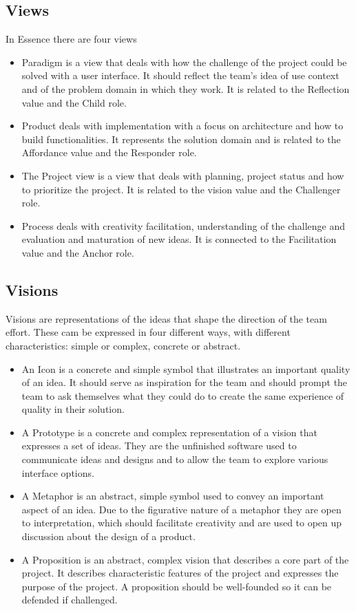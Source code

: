 \subsection{Views} 
In Essence there are four views

\begin{itemize}
\item Paradigm is a view that deals with how the challenge of the project could be solved with a user interface. It should reflect the team's idea of use context and of the problem domain in which they work. It is related to the Reflection value and the Child role.
\item Product deals with implementation with a focus on architecture and how to build functionalities. It represents the solution domain and is related to the Affordance value and the Responder role.
\item The Project view is a view that deals with planning, project status and how to prioritize the project. It is related to the vision value and the Challenger role. 
\item Process deals with creativity facilitation, understanding of the challenge and evaluation and maturation of new ideas. It is connected to the Facilitation value and the Anchor role. 
\end{itemize} 

\subsection{Visions} 
Visions are representations of the ideas that shape the direction of the team effort. These cam be expressed in four different ways, with different characteristics: simple or complex, concrete or abstract.
\begin{itemize}
\item An Icon is a concrete and simple symbol that illustrates an important quality of an idea. It should serve as inspiration for the team and should prompt the team to ask themselves what they could do to create the same experience of quality in their solution.
\item A Prototype is a concrete and complex representation of a vision that expresses a set of ideas. They are the unfinished software used to communicate ideas and designs and to allow the team to explore various interface options. 
\item A Metaphor is an abstract, simple symbol used to convey an important aspect of an idea. Due to the figurative nature of a metaphor they are open to interpretation, which should facilitate creativity and are used to open up discussion about the design of a product. 
\item A Proposition is an abstract, complex vision that describes a core part of the project. It describes characteristic features of the project and expresses the purpose of the project. A proposition should be well-founded so it can be defended if challenged.
\end{itemize} 
